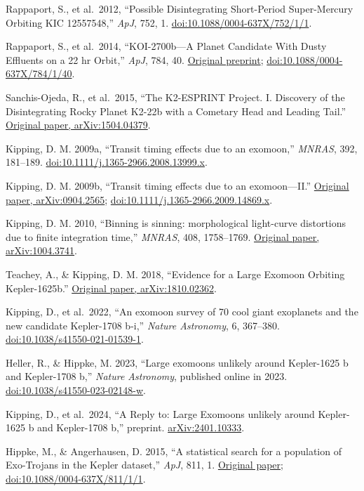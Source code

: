 \documentclass[
  english,
]{article}
\begin{document}
Rappaport, S., et al.~2012, ``Possible Disintegrating Short-Period
Super-Mercury Orbiting KIC 12557548,'' \emph{ApJ}, 752, 1.
\href{https://doi.org/10.1088/0004-637X/752/1/1}{doi:10.1088/0004-637X/752/1/1}.

Rappaport, S., et al.~2014, ``KOI-2700b---A Planet Candidate With Dusty
Effluents on a 22 hr Orbit,'' \emph{ApJ}, 784, 40.
\href{https://arxiv.org/abs/1312.2054}{Original preprint};
\href{https://doi.org/10.1088/0004-637X/784/1/40}{doi:10.1088/0004-637X/784/1/40}.

Sanchis-Ojeda, R., et al.~2015, ``The K2-ESPRINT Project. I. Discovery
of the Disintegrating Rocky Planet K2-22b with a Cometary Head and
Leading Tail.'' \href{https://arxiv.org/abs/1504.04379}{Original paper,
arXiv:1504.04379}.

Kipping, D. M. 2009a, ``Transit timing effects due to an exomoon,''
\emph{MNRAS}, 392, 181--189.
\href{https://doi.org/10.1111/j.1365-2966.2008.13999.x}{doi:10.1111/j.1365-2966.2008.13999.x}.

Kipping, D. M. 2009b, ``Transit timing effects due to an exomoon---II.''
\href{https://arxiv.org/abs/0904.2565}{Original paper, arXiv:0904.2565};
\href{https://doi.org/10.1111/j.1365-2966.2009.14869.x}{doi:10.1111/j.1365-2966.2009.14869.x}.

Kipping, D. M. 2010, ``Binning is sinning: morphological light-curve
distortions due to finite integration time,'' \emph{MNRAS}, 408,
1758--1769. \href{https://arxiv.org/abs/1004.3741}{Original paper,
arXiv:1004.3741}.

Teachey, A., \& Kipping, D. M. 2018, ``Evidence for a Large Exomoon
Orbiting Kepler-1625b.''
\href{https://arxiv.org/abs/1810.02362}{Original paper,
arXiv:1810.02362}.

Kipping, D., et al.~2022, ``An exomoon survey of 70 cool giant
exoplanets and the new candidate Kepler-1708 b-i,'' \emph{Nature
Astronomy}, 6, 367--380.
\href{https://doi.org/10.1038/s41550-021-01539-1}{doi:10.1038/s41550-021-01539-1}.

Heller, R., \& Hippke, M. 2023, ``Large exomoons unlikely around
Kepler-1625 b and Kepler-1708 b,'' \emph{Nature Astronomy}, published
online in 2023.
\href{https://doi.org/10.1038/s41550-023-02148-w}{doi:10.1038/s41550-023-02148-w}.

Kipping, D., et al.~2024, ``A Reply to: Large Exomoons unlikely around
Kepler-1625 b and Kepler-1708 b,'' preprint.
\href{https://arxiv.org/abs/2401.10333}{arXiv:2401.10333}.

Hippke, M., \& Angerhausen, D. 2015, ``A statistical search for a
population of Exo-Trojans in the Kepler dataset,'' \emph{ApJ}, 811, 1.
\href{https://arxiv.org/abs/1508.00427}{Original paper};
\href{https://doi.org/10.1088/0004-637X/811/1/1}{doi:10.1088/0004-637X/811/1/1}.
\end{document}
